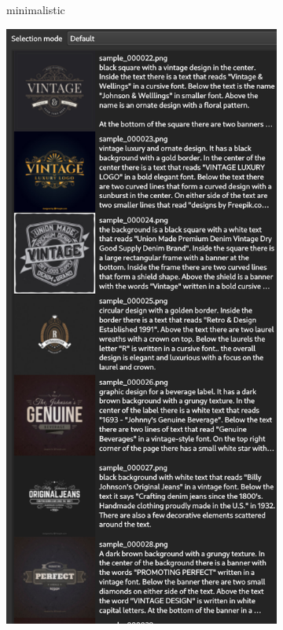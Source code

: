 \documentclass[12pt, %
openright, 
oneside, %
a4paper,    %
brazil]{facom-ufu-abntex2}
\begin{document}
\begin{figure}[H]
\begin{subfigure}{0.2\textwidth}
      \caption{minimalistic}
    \end{subfigure}
    \begin{subfigure}{0.2\textwidth}
      \centering
      \includegraphics[width=\linewidth]{vintage.png}

\end{subfigure}
\end{figure}
\end{document}
